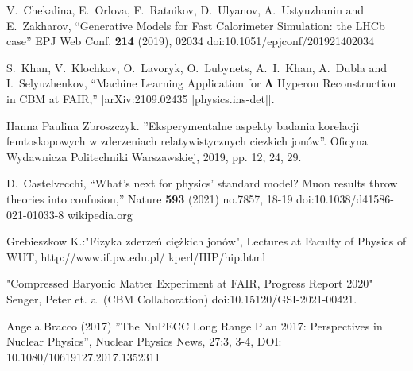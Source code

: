 \begin{thebibliography}{99}
	\thispagestyle{fancy}
	
    V.~Chekalina, E.~Orlova, F.~Ratnikov, D.~Ulyanov, A.~Ustyuzhanin and E.~Zakharov,
    ``Generative Models for Fast Calorimeter Simulation: the LHCb case''
    EPJ Web Conf. \textbf{214} (2019), 02034
    doi:10.1051/epjconf/201921402034
    
    S.~Khan, V.~Klochkov, O.~Lavoryk, O.~Lubynets, A.~I.~Khan, A.~Dubla and I.~Selyuzhenkov,
    ``Machine Learning Application for $\mathbf{\Lambda}$ Hyperon Reconstruction in CBM at FAIR,''
    [arXiv:2109.02435 [physics.ins-det]].
    
	 Hanna Paulina Zbroszczyk. ''Eksperymentalne aspekty badania korelacji femtoskopowych w zderzeniach relatywistycznych ciezkich jonów''. Oficyna Wydawnicza Politechniki Warszawskiej, 2019, pp. 12, 24, 29.
	
	D.~Castelvecchi,
    ``What\textquoteright{}s next for physics\textquoteright{} standard model? Muon results throw theories into confusion,''
    Nature \textbf{593} (2021) no.7857, 18-19
    doi:10.1038/d41586-021-01033-8
    wikipedia.org
    
    Grebieszkow K.:"Fizyka zderzeń ciężkich jonów", Lectures at Faculty of Physics of WUT, http://www.if.pw.edu.pl/ kperl/HIP/hip.html
    
    "Compressed Baryonic Matter Experiment at FAIR, Progress Report 2020" Senger, Peter et. al (CBM Collaboration) doi:10.15120/GSI-2021-00421.
    
    Angela Bracco (2017) ''The NuPECC Long Range Plan 2017: Perspectives in Nuclear Physics'', Nuclear Physics News, 27:3, 3-4, DOI: 10.1080/10619127.2017.1352311
    

\end{thebibliography}
